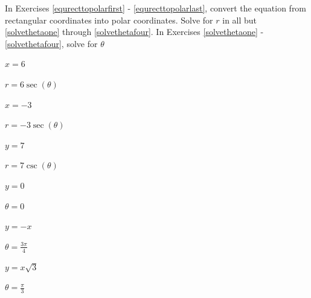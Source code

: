 \documentclass{ximera}
\begin{document}
\begin{question}

In Exercises \ref{equrecttopolarfirst} - \ref{equrecttopolarlast}, convert the equation from rectangular coordinates into polar coordinates.  Solve for $r$ in all but \ref{solvethetaone} through \ref{solvethetafour}.  In Exercises \ref{solvethetaone} - \ref{solvethetafour},  solve for $\theta$

\begin{problem}\label{equrecttopolarfirst}
$x = 6$ 

\begin{solution}
$r = 6\sec(\theta)$
\end{solution}
\end{problem}

\begin{problem}
$x = -3$

\begin{solution}
$r = -3\sec(\theta)$
\end{solution}

\end{problem}

\begin{problem}
$y = 7$

\begin{solution}
$r = 7\csc(\theta)$
\end{solution}
\end{problem}

\begin{problem}\label{solvethetaone}
$y = 0$

\begin{solution}

$\theta = 0$

\end{solution}
\end{problem}

\begin{problem}
$y = -x$

\begin{solution}
$\theta = \frac{3\pi}{4}$
\end{solution}
\end{problem}

\begin{problem}
$y = x\sqrt{3}$

\begin{solution}
$\theta = \frac{\pi}{3}$ 
\end{solution}

\end{problem}


\end{question}
\end{document}
